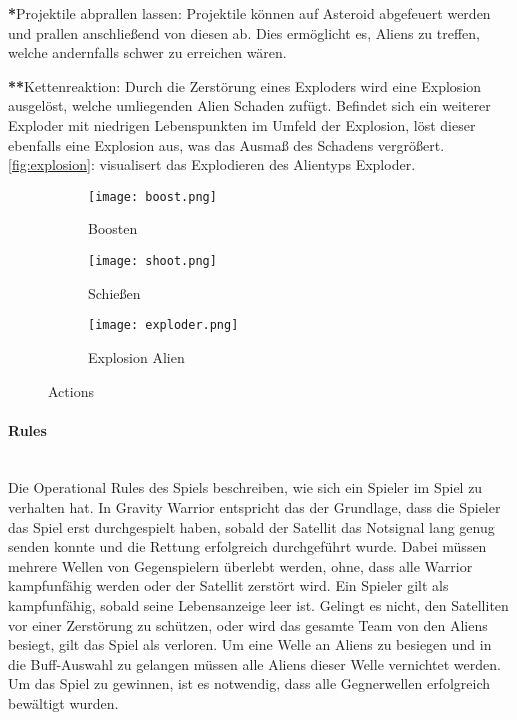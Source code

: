 \documentclass[11pt]{scrartcl}
\newcommand{\lbparagraph}[1]{\paragraph*{#1}\mbox{}\\}
\begin{document}
\textbf{*}Projektile abprallen lassen: Projektile können auf Asteroid abgefeuert werden und prallen anschließend von diesen ab. Dies ermöglicht es, Aliens zu treffen, welche andernfalls schwer zu erreichen wären.

\textbf{**}Kettenreaktion: Durch die Zerstörung eines Exploders wird eine Explosion ausgelöst, welche umliegenden Alien Schaden zufügt. Befindet sich ein weiterer Exploder mit niedrigen Lebenspunkten im Umfeld der Explosion, löst dieser ebenfalls eine Explosion aus, was das Ausmaß des Schadens vergrößert. \autoref{fig:explosion}:  visualisert das Explodieren des Alientyps Exploder.  


\begin{figure}[htp]
  \begin{subfigure}[b]{0.32\textwidth}
    \texttt{[image: boost.png]}
    \caption{Boosten}
    \label{fig:boost}
  \end{subfigure}
  \begin{subfigure}[b]{0.32\textwidth}
    \texttt{[image: shoot.png]}
    \caption{Schießen}
    \label{fig:shoot}
  \end{subfigure}
  \begin{subfigure}[b]{0.32\textwidth}
    \texttt{[image: exploder.png]}
    \caption{Explosion Alien}
    \label{fig:explosion}
  \end{subfigure}
  \caption{Actions}
  \label{fig:actions}
\end{figure}


\lbparagraph{Rules}
Die Operational Rules des Spiels beschreiben, wie sich ein Spieler im Spiel zu verhalten hat\cite{K2011}. In Gravity Warrior entspricht das der Grundlage, dass die Spieler das Spiel erst durchgespielt haben, sobald der Satellit das Notsignal lang genug senden konnte und die Rettung erfolgreich durchgeführt wurde. Dabei müssen mehrere Wellen von Gegenspielern überlebt werden, ohne, dass alle Warrior kampfunfähig werden oder der Satellit zerstört wird. Ein Spieler gilt als kampfunfähig, sobald seine Lebensanzeige leer ist. Gelingt es nicht, den Satelliten vor einer Zerstörung zu schützen, oder wird das gesamte Team von den Aliens besiegt, gilt das Spiel als verloren. Um eine Welle an Aliens zu besiegen und in die Buff-Auswahl zu gelangen müssen alle Aliens dieser Welle vernichtet werden. Um das Spiel zu gewinnen, ist es notwendig, dass alle Gegnerwellen erfolgreich bewältigt wurden.
\end{document}
